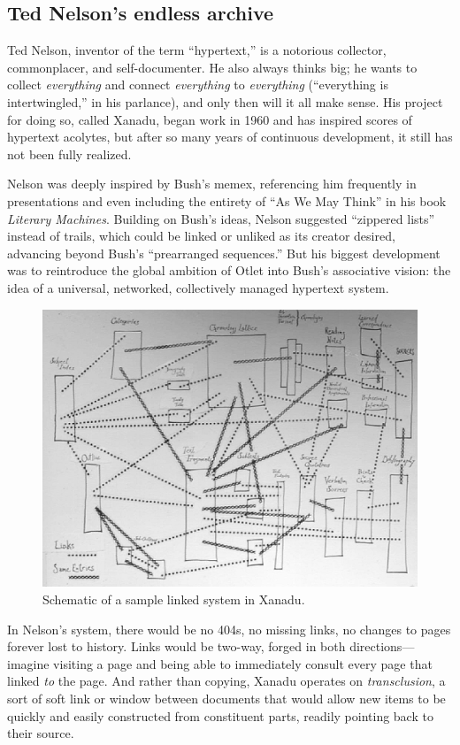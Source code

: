 \subsection{Ted Nelson's endless archive}

Ted Nelson, inventor of the term ``hypertext,'' is a notorious collector, commonplacer, and self-documenter. He also always thinks big; he wants to collect \emph{everything} and connect \emph{everything} to \emph{everything} (``everything is intertwingled,'' in his parlance), and only then will it all make sense. His project for doing so, called Xanadu, began work in 1960 and has inspired scores of hypertext acolytes, but after so many years of continuous development, it still has not been fully realized.

Nelson was deeply inspired by Bush's memex, referencing him frequently in presentations and even including the entirety of ``As We May Think'' in his book \emph{Literary Machines}. Building on Bush's ideas, Nelson suggested ``zippered lists'' instead of trails, which could be linked or unliked as its creator desired, advancing beyond Bush's ``prearranged sequences.''\autocite[313]{nelson_computer_1974} But his biggest development was to reintroduce the global ambition of Otlet into Bush's associative vision: the idea of a universal, networked, collectively managed hypertext system.

\begin{figure}[ht]
\centering
\includegraphics[width=350pt]{figures/xanadu}
\caption{Schematic of a sample linked system in Xanadu.}
\label{fig:xanadu}
\end{figure}

In Nelson's system, there would be no 404s, no missing links, no changes to pages forever lost to history. Links would be two-way, forged in both directions---imagine visiting a page and being able to immediately consult every page that linked \emph{to} the page. And rather than copying, Xanadu operates on \emph{transclusion}, a sort of soft link or window between documents that would allow new items to be quickly and easily constructed from constituent parts, readily pointing back to their source.

